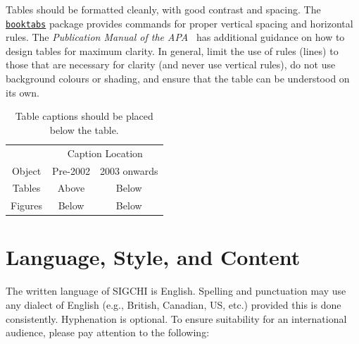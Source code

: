 \documentclass[preprint]{../latex/sigchi-modern}
\begin{document}
Tables should be formatted cleanly, with good contrast and spacing. The
\href{http://ctan.org/pkg/booktabs}{\texttt{booktabs}} package provides commands
for proper vertical spacing and horizontal rules. The
\textit{Publication Manual of the APA}~\cite{apa} has additional guidance on how
to design tables for maximum clarity. In general, limit the use of rules (lines)
to those that are necessary for clarity (and never use vertical rules), do not 
use background colours or shading, and ensure that the table can be understood
on its own.

\begin{table}
  \centering
  \begin{tabular}{ccc}
    \toprule
    & \multicolumn{2}{c}{Caption Location} \\
    \cmidrule(r){2-3}
    Object & Pre-2002 & 2003 onwards \\
    \midrule
    Tables & Above & Below \\
    Figures & Below & Below \\
    \bottomrule
  \end{tabular}
  \caption{Table captions should be placed below the table.}
  \label{tab:table1}
\end{table}

\section{Language, Style, and Content}
The written language of SIGCHI is English. Spelling and punctuation may use any
dialect of English (e.g., British, Canadian, US, etc.) provided this is done
consistently. Hyphenation is optional. To ensure suitability for an
international audience, please pay attention to the following:
\end{document}
